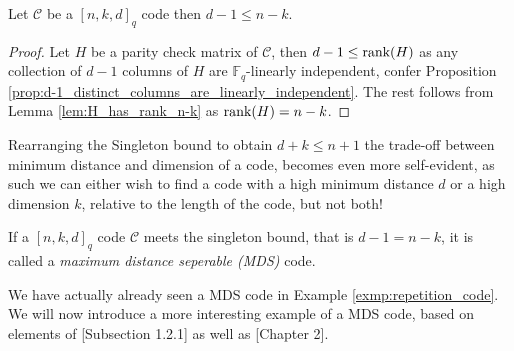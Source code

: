 \begin{corollary}\label{cor:singleton_bound}
  Let $\mathcal{C}$ be a $[n, k, d]_q$ code then $d-1 \leq n - k$.
\end{corollary}

\begin{proof}
  Let $H$ be a parity check matrix of $\mathcal{C}$, then $d - 1 \leq \textnormal{rank}(H)$ as any collection of $d-1$ columns of $H$ are $\mathbb{F}_{q}$-linearly independent, confer Proposition \ref{prop:d-1_distinct_columns_are_linearly_independent}. The rest follows from Lemma \ref{lem:H_has_rank_n-k} as $\textnormal{rank}(H) = n -k$.
\end{proof}

\begin{remark}\label{rem:alternative_formulation_of_singleton_bound}
  Rearranging the Singleton bound to obtain $d + k \leq n + 1$ the trade-off between minimum distance and dimension of a code, becomes even more self-evident, as such we can either wish to find a code with a high minimum distance $d$ or a high dimension $k$, relative to the length of the code, but not both!
\end{remark}

\begin{definition}\label{def:MDS_code}
  If a $[n, k, d]_{q}$ code $\mathcal{C}$ meets the singleton bound, that is $d - 1 = n - k$, it is called a \textit{maximum distance seperable (MDS)} code.
\end{definition}

We have actually already seen a MDS code in Example \ref{exmp:repetition_code}. We will now introduce a more interesting example of a MDS code, based on elements of \cite{alg_geom_codes}[Subsection 1.2.1] as well as \cite{notes_on_alg_geom_codes}[Chapter 2].


